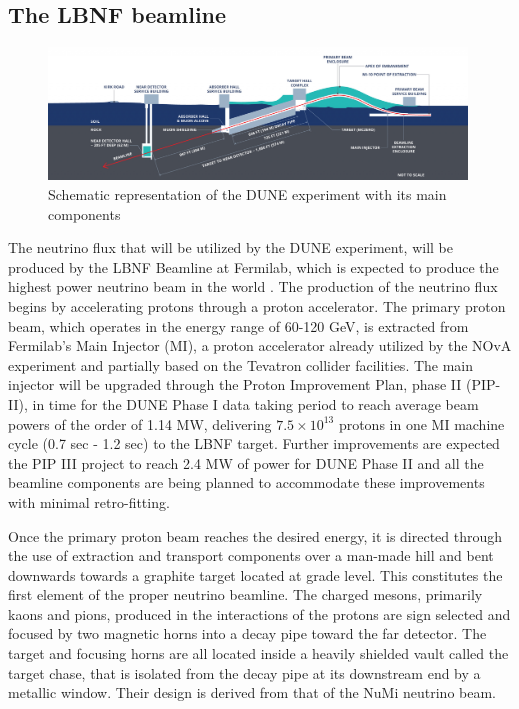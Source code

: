 \subsection{The LBNF beamline}
\begin{figure}[!h]
     \centering
     \includegraphics[width=0.99\textwidth]{figures/ch3-DUNE/LBNF-IL-graphic-Fermilab-LBNF.png}
     \caption{Schematic representation of the DUNE experiment with its main components}
        \label{fig:KFdiagram}
\end{figure}
The neutrino flux that will be utilized by the DUNE experiment, will be produced by the LBNF Beamline at Fermilab, which is expected to produce the highest power neutrino beam in the world \cite{DUNE:2016LBNFTDR, Papadimitriou:2016ksv}. The production of the neutrino flux begins by accelerating protons through a proton accelerator. The primary proton beam, which operates in the energy range of 60-120 GeV, is extracted from Fermilab's Main Injector (MI), a proton accelerator already utilized by the NOvA experiment and partially based on the Tevatron collider facilities. The main injector will be upgraded through the Proton Improvement Plan, phase II (PIP-II), in time for the DUNE Phase I data taking period to reach average beam powers of the order of 1.14 MW, delivering $7.5 \times 10^{13}$ protons in one MI machine cycle (0.7 sec - 1.2 sec) to the LBNF target. Further improvements are expected the PIP III project to reach 2.4 MW of power for DUNE Phase II and all the beamline components are being planned to accommodate these improvements with minimal retro-fitting. 

Once the primary proton beam reaches the desired energy, it is directed through the use of extraction and transport components over a man-made hill and bent downwards towards a graphite target located at grade level. This constitutes the first element of the proper neutrino beamline. The charged mesons, primarily kaons and pions, produced in the interactions of the protons are sign selected and focused by two magnetic horns into a decay pipe toward the far detector. The target and focusing horns are all located inside a heavily shielded vault called the target chase, that is isolated from the decay pipe at its downstream end by a metallic window. Their design is derived from that of the NuMi neutrino beam. 

